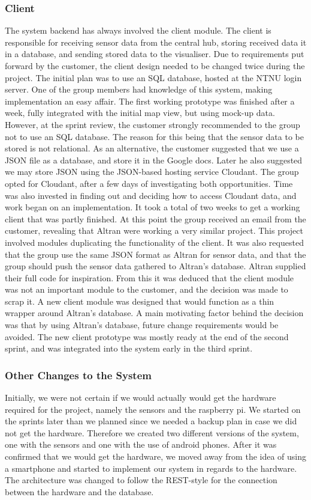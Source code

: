 \documentclass[../document.tex]{subfiles}
\begin{document}
\subsubsection{Client}
The system backend has always involved the client module. The client is responsible for receiving sensor data from the central hub, storing received data it in a database, and sending stored data to the visualiser. Due to requirements put forward by the customer, the client design needed to be changed twice during the project. The initial plan was to use an \gls{SQL} database, hosted at the \gls{NTNU} login server. One of the group members had knowledge of this system, making implementation an easy affair. The first working prototype was finished after a week, fully integrated with the initial map view, but using mock-up data. However, at the sprint review, the customer strongly recommended to the group not to use an \gls{SQL} database. The reason for this being that the sensor data to be stored is not relational. As an alternative, the customer suggested that we use a \gls{JSON} file as a database, and store it in the Google docs. Later he also suggested we may store \gls{JSON} using the \gls{JSON}-based hosting service Cloudant. The group opted for Cloudant, after a few days of investigating both opportunities. Time was also invested in finding out and deciding how to access Cloudant data, and work began on an implementation. It took a total of two weeks to get a working client that was partly finished. At this point the group received an email from the customer, revealing that \gls{Altran} were working a very similar project. This project involved modules duplicating the functionality of the client. It was also requested that the group use the same \gls{JSON} format as \gls{Altran} for sensor data, and that the group should push the sensor data gathered to Altran’s database. \gls{Altran} supplied their full code for inspiration. From this it was deduced that the client module was not an important module to the customer, and the decision was made to scrap it. A new client module was designed that would function as a thin wrapper around Altran’s database. A main motivating factor behind the decision was that by using Altran’s database, future change requirements would be avoided. The new client prototype was mostly ready at the end of the second sprint, and was integrated into the system early in the third sprint.

\subsubsection{Other Changes to the System}
Initially, we were not certain if we would actually would get the hardware required for the project, namely the sensors and the raspberry pi. We started on the sprints later than we planned since we needed a backup plan in case we did not get the hardware. Therefore we created two different versions of the system, one with the sensors and one with the use of android phones. After it was confirmed that we would get the hardware, we moved away from the idea of using a smartphone and started to implement our system in regards to the hardware. The architecture was changed to follow the REST-style for the connection between the hardware and the database. 
\end{document}
